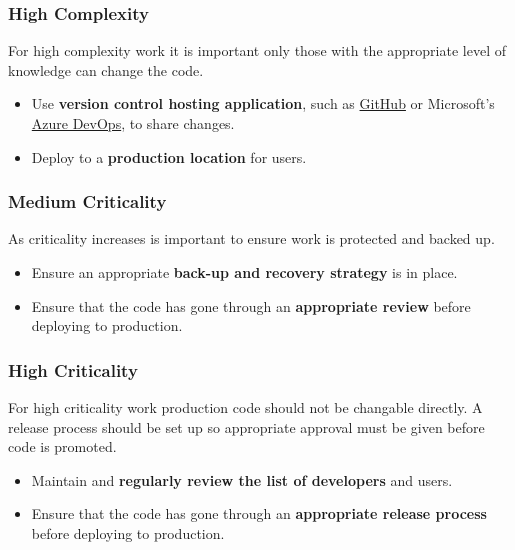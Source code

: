 \documentclass[]{book}
\providecommand{\tightlist}{%
  \setlength{\itemsep}{0pt}\setlength{\parskip}{0pt}}
\begin{document}
\hypertarget{high-complexity-4}{%
\subsubsection{High Complexity}\label{high-complexity-4}}

For high complexity work it is important only those with the appropriate level of
knowledge can change the code.

\begin{itemize}
\tightlist
\item
  Use \textbf{version control hosting application}, such as \href{https://help.github.com/}{GitHub} or
  Microsoft's \href{https://azure.microsoft.com/en-us/product-categories/devops/}{Azure DevOps}, to
  share changes.
\item
  Deploy to a \textbf{production location} for users.
\end{itemize}

\hypertarget{medium-criticality-4}{%
\subsubsection{Medium Criticality}\label{medium-criticality-4}}

As criticality increases is important to ensure work is protected and backed up.

\begin{itemize}
\tightlist
\item
  Ensure an appropriate \textbf{back-up and recovery strategy} is in place.
\item
  Ensure that the code has gone through an \textbf{appropriate review} before deploying to production.
\end{itemize}

\hypertarget{high-criticality-4}{%
\subsubsection{High Criticality}\label{high-criticality-4}}

For high criticality work production code should not be changable directly. A release
process should be set up so appropriate approval must be given before code is promoted.

\begin{itemize}
\tightlist
\item
  Maintain and \textbf{regularly review the list of developers} and users.
\item
  Ensure that the code has gone through an \textbf{appropriate release process} before deploying to
  production.
\end{itemize}
\end{document}
